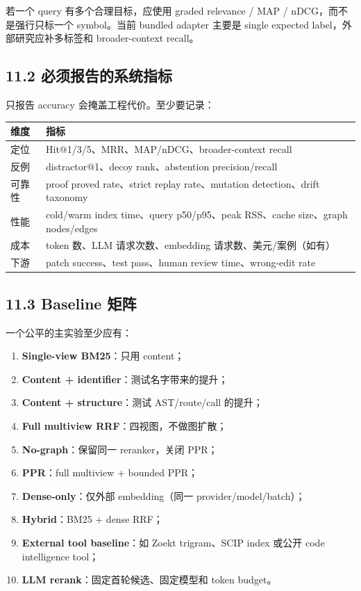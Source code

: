 \documentclass[UTF8,12pt,openany]{ctexbook}
\begin{document}
若一个 query 有多个合理目标，应使用 graded relevance / MAP / nDCG，而不是强行只标一个 symbol。当前 bundled adapter 主要是 single expected label，外部研究应补多标签和 broader-context recall。\par

\subsection{11.2 必须报告的系统指标}

只报告 accuracy 会掩盖工程代价。至少要记录：\par

\begin{center}
\small
\begin{longtable}{|p{}|p{}|}
\toprule
维度 & 指标 \\
\midrule
定位 & Hit@1/3/5、MRR、MAP/nDCG、broader-context recall \\
反例 & distractor@1、decoy rank、abstention precision/recall \\
可靠性 & proof proved rate、strict replay rate、mutation detection、drift taxonomy \\
性能 & cold/warm index time、query p50/p95、peak RSS、cache size、graph nodes/edges \\
成本 & token 数、LLM 请求次数、embedding 请求数、美元/案例（如有） \\
下游 & patch success、test pass、human review time、wrong-edit rate \\
\bottomrule
\end{longtable}
\end{center}

\subsection{11.3 Baseline 矩阵}

一个公平的主实验至少应有：\par

\begin{enumerate}
\item \textbf{Single-view BM25}：只用 content；
\item \textbf{Content + identifier}：测试名字带来的提升；
\item \textbf{Content + structure}：测试 AST/route/call 的提升；
\item \textbf{Full multiview RRF}：四视图，不做图扩散；
\item \textbf{No-graph}：保留同一 reranker，关闭 PPR；
\item \textbf{PPR}：full multiview + bounded PPR；
\item \textbf{Dense-only}：仅外部 embedding（同一 provider/model/batch）；
\item \textbf{Hybrid}：BM25 + dense RRF；
\item \textbf{External tool baseline}：如 Zoekt trigram、SCIP index 或公开 code intelligence tool；
\item \textbf{LLM rerank}：固定首轮候选、固定模型和 token budget。
\end{enumerate}
\end{document}
